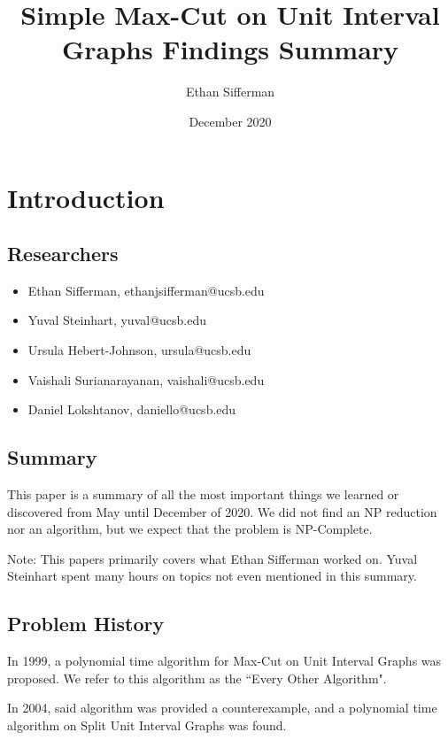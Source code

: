 \documentclass[12pt]{article}
\title{Simple Max-Cut on Unit Interval Graphs Findings Summary}
\author{Ethan Sifferman}
\date{December 2020}
\begin{document}

\setlength{\parindent}{0cm}
\setlength{\parskip}{1em}

\maketitle


\section{Introduction}


\subsection{Researchers}
\begin{itemize}
    \item Ethan Sifferman, ethanjsifferman@ucsb.edu
    \item Yuval Steinhart, yuval@ucsb.edu
    \item Ursula Hebert-Johnson, ursula@ucsb.edu
    \item Vaishali Surianarayanan, vaishali@ucsb.edu
    \item Daniel Lokshtanov, daniello@ucsb.edu
\end{itemize}

\subsection{Summary}
This paper is a summary of all the most important things we learned or discovered from May until December of 2020. We did not find an NP reduction nor an algorithm, but we expect that the problem is NP-Complete.

Note: This papers primarily covers what Ethan Sifferman worked on. Yuval Steinhart spent many hours on topics not even mentioned in this summary.

\subsection{Problem History}
In 1999, a polynomial time algorithm for Max-Cut on Unit Interval Graphs was proposed. We refer to this algorithm as the ``Every Other Algorithm".

In 2004, said algorithm was provided a counterexample, and a polynomial time algorithm on Split Unit Interval Graphs was found.
\end{document}
